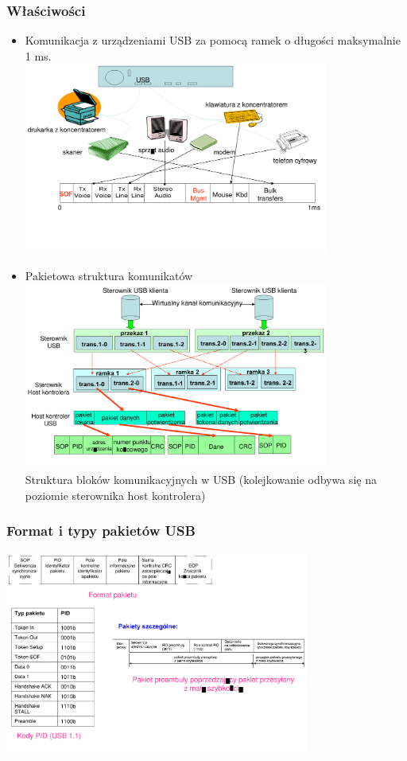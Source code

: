 	\subsubsection{Właściwości}
	\begin{itemize}
		\item Komunikacja z urządzeniami USB za pomocą ramek o długości maksymalnie 1 ms.\\
		\includegraphics[width=10cm]{./wyklady/USB_18_1.pdf}
		\item Pakietowa struktura komunikatów\\
		\includegraphics[width=10cm]{./wyklady/USB_19_1.pdf}\\
		Struktura bloków komunikacyjnych w USB (kolejkowanie odbywa się na poziomie sterownika host kontrolera)
	\end{itemize}
	\subsubsection{Format i typy pakietów USB}
	\includegraphics[width=10cm]{./wyklady/USB_20_1.pdf}
